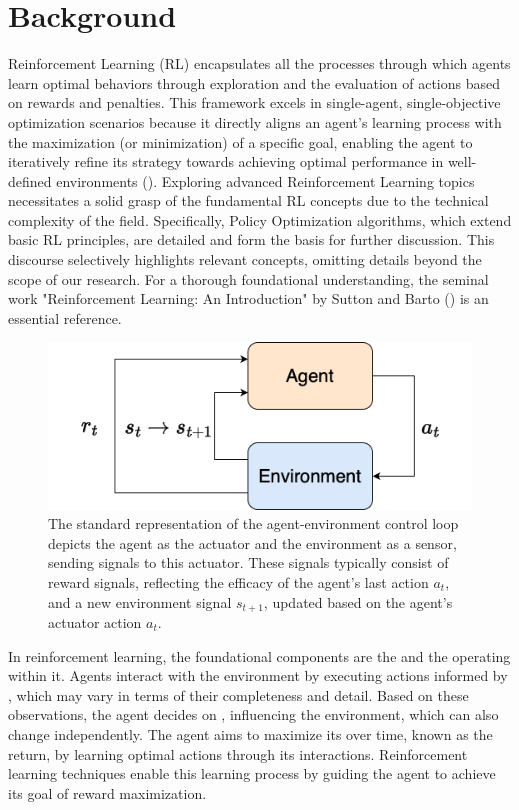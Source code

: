 \section{Background}
\label{sec:background}

\noindent Reinforcement Learning (RL) encapsulates all the processes through which agents learn optimal behaviors through exploration and the evaluation of actions based on rewards and penalties. This framework excels in single-agent, single-objective optimization scenarios because it directly aligns an agent's learning process with the maximization (or minimization) of a specific goal, enabling the agent to iteratively refine its strategy towards achieving optimal performance in well-defined environments (\textcolor{deepblue}{\cite{Lee_2020}}). Exploring advanced Reinforcement Learning topics necessitates a solid grasp of the fundamental RL concepts due to the technical complexity of the field. Specifically, Policy Optimization algorithms, which extend basic RL principles, are detailed and form the basis for further discussion. This discourse selectively highlights relevant concepts, omitting details beyond the scope of our research. For a thorough foundational understanding, the seminal work "Reinforcement Learning: An Introduction" by Sutton and Barto (\textcolor{deepblue}{\cite{Sutton1998}}) is an essential reference.

\bigskip

\begin{figure}[htbp]
    \centering
    \includegraphics[width=0.6\linewidth]{images/intro/background/rl_simple.png}
    \captionsetup{justification=justified, singlelinecheck=false, width=1\linewidth, labelfont=bf}  
    \caption{The standard representation of the agent-environment control loop depicts the agent as the actuator and the environment as a sensor, sending signals to this actuator. These signals typically consist of reward signals, reflecting the efficacy of the agent's last action $a_t$, and a new environment signal $s_{t+1}$, updated based on the agent's actuator action $a_t$.}
    \label{fig:rl_simple}
\end{figure}

\noindent In reinforcement learning, the foundational components are the  and the  operating within it. Agents interact with the environment by executing actions informed by , which may vary in terms of their completeness and detail. Based on these observations, the agent decides on , influencing the environment, which can also change independently. The agent aims to maximize its  over time, known as the return, by learning optimal actions through its interactions. Reinforcement learning techniques enable this learning process by guiding the agent to achieve its goal of reward maximization.

